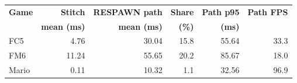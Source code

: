 \begin{tabular}{@{}lrrrrr@{}}
\toprule
\textbf{Game} & \textbf{Stitch} & \textbf{RESPAWN path} & \textbf{Share} & \textbf{Path p95} & \textbf{Path FPS} \\
 & \textbf{mean (ms)} & \textbf{mean (ms)} & \textbf{(\%)} & \textbf{(ms)} & \\
\midrule
FC5 & 4.76 & 30.04 & 15.8 & 55.64 & 33.3 \\
FM6 & 11.24 & 55.65 & 20.2 & 85.67 & 18.0 \\
Mario & 0.11 & 10.32 & 1.1 & 32.56 & 96.9 \\
\bottomrule
\end{tabular}
